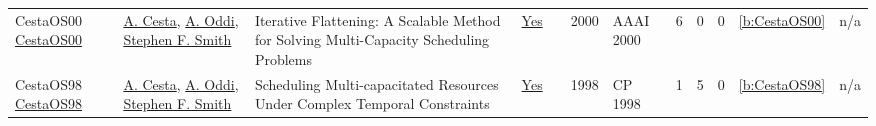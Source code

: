 {\begin{longtable}{>{\raggedright\arraybackslash}p{3cm}>{\raggedright\arraybackslash}p{6cm}>{\raggedright\arraybackslash}p{6.5cm}rrrp{2.5cm}rrrrr}
CestaOS00 \href{http://www.aaai.org/Library/AAAI/2000/aaai00-114.php}{CestaOS00} & \hyperref[auth:a286]{A. Cesta}, \hyperref[auth:a284]{A. Oddi}, \hyperref[auth:a300]{Stephen F. Smith} & Iterative Flattening: {A} Scalable Method for Solving Multi-Capacity Scheduling Problems & \href{../works/CestaOS00.pdf}{Yes} & \cite{CestaOS00} & 2000 & AAAI 2000 & 6 & 0 & 0 & \ref{b:CestaOS00} & n/a\\
CestaOS98 \href{https://doi.org/10.1007/3-540-49481-2_36}{CestaOS98} & \hyperref[auth:a286]{A. Cesta}, \hyperref[auth:a284]{A. Oddi}, \hyperref[auth:a300]{Stephen F. Smith} & Scheduling Multi-capacitated Resources Under Complex Temporal Constraints & \href{../works/CestaOS98.pdf}{Yes} & \cite{CestaOS98} & 1998 & CP 1998 & 1 & 5 & 0 & \ref{b:CestaOS98} & n/a\\
\end{longtable}
}

\clearpage
